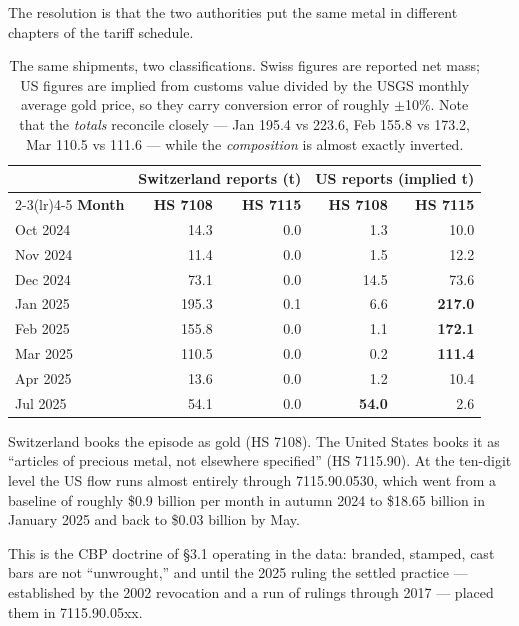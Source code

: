 \documentclass[11pt,a4paper]{article}
\begin{document}
The resolution is that the two authorities put the same metal in different chapters of the
tariff schedule.

\begin{table}[h]
\centering
\begin{tabular}{@{}lrrrr@{}}
\toprule
& \multicolumn{2}{c}{\textbf{Switzerland reports (t)}} &
  \multicolumn{2}{c}{\textbf{US reports (implied t)}} \\
\cmidrule(lr){2-3}\cmidrule(lr){4-5}
\textbf{Month} & \textbf{HS 7108} & \textbf{HS 7115} & \textbf{HS 7108} & \textbf{HS 7115} \\
\midrule
Oct 2024 & 14.3 & 0.0 & 1.3 & 10.0 \\
Nov 2024 & 11.4 & 0.0 & 1.5 & 12.2 \\
Dec 2024 & 73.1 & 0.0 & 14.5 & 73.6 \\
Jan 2025 & 195.3 & 0.1 & 6.6 & \textbf{217.0} \\
Feb 2025 & 155.8 & 0.0 & 1.1 & \textbf{172.1} \\
Mar 2025 & 110.5 & 0.0 & 0.2 & \textbf{111.4} \\
Apr 2025 & 13.6 & 0.0 & 1.2 & 10.4 \\
Jul 2025 & 54.1 & 0.0 & \textbf{54.0} & 2.6 \\
\bottomrule
\end{tabular}
\caption{The same shipments, two classifications. Swiss figures are reported net mass; US
figures are implied from customs value divided by the USGS monthly average gold price, so they
carry conversion error of roughly $\pm$10\%. Note that the \emph{totals} reconcile closely ---
Jan 195.4 vs 223.6, Feb 155.8 vs 173.2, Mar 110.5 vs 111.6 --- while the \emph{composition} is
almost exactly inverted.}
\label{tab:classification}
\end{table}

Switzerland books the episode as gold (HS 7108). The United States books it as ``articles of
precious metal, not elsewhere specified'' (HS 7115.90). At the ten-digit level the US flow
runs almost entirely through 7115.90.0530, which went from a baseline of roughly \$0.9 billion
per month in autumn 2024 to \$18.65 billion in January 2025 and back to \$0.03 billion by May.

This is the CBP doctrine of \S3.1 operating in the data: branded, stamped, cast bars are not
``unwrought,'' and until the 2025 ruling the settled practice --- established by the 2002
revocation and a run of rulings through 2017 --- placed them in 7115.90.05xx.
\end{document}
